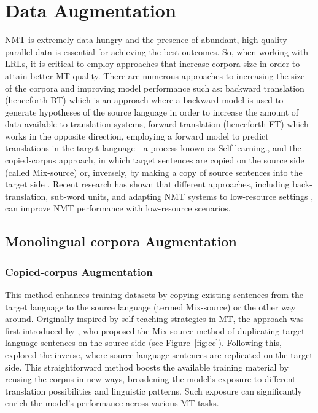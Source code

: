 %
%

\section{Data Augmentation}
NMT is extremely data-hungry \cite{sutskever14, bahdanau15, vaswani17} and the presence of abundant, high-quality parallel data is essential for achieving the best outcomes.  
So, when working with LRLs, it is critical to employ approaches that increase corpora size in order to attain better MT quality.
There are numerous approaches to increasing the size of the corpora and improving model performance such as: backward translation (henceforth BT) \cite{sennrich16, edunov18} which is an approach where a backward model is used to generate hypotheses of the source language in order to increase the amount of data available to translation systems, forward translation (henceforth FT) \cite{zhang20} which works in the opposite direction, employing a forward model to predict translations in the target language - a process known as Self-learning., and the copied-corpus approach, in which target sentences are copied on the source side \cite{ha16} (called Mix-source) or, inversely, by making a copy of source sentences into the target side \cite{sanchez21}. 
Recent research has shown that different approaches, including back-translation, sub-word units, and adapting NMT systems to low-resource settings \cite{sennrich19}, can improve NMT performance with low-resource scenarios.
\subsection{Monolingual corpora Augmentation}

\subsubsection{Copied-corpus Augmentation}
This method enhances training datasets by copying existing sentences from the target language to the source language (termed Mix-source) or the other way around.
Originally inspired by self-teaching strategies in MT, the approach was first introduced by \cite{ha16}, who proposed the Mix-source method of duplicating target language sentences on the source side (see Figure~\ref{fig:cc}). 
Following this, \cite{sanchez21} explored the inverse, where source language sentences are replicated on the target side. 
This straightforward method boosts the available training material by reusing the corpus in new ways, broadening the model's exposure to different translation possibilities and linguistic patterns. 
Such exposure can significantly enrich the model's performance across various MT tasks.

